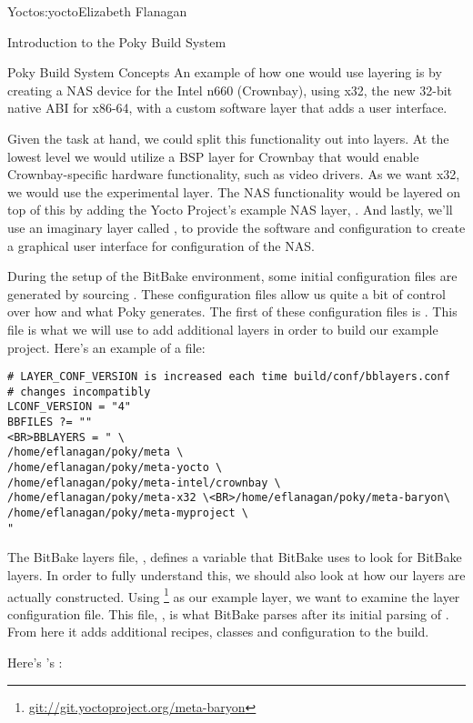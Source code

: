 \begin{aosachapter}{Yocto}{s:yocto}{Elizabeth Flanagan}
\begin{aosasect1}{Introduction to the Poky Build System}
\begin{aosasect2}{Poky Build System Concepts}
An example of how one would use layering is by creating a NAS device
for the Intel n660 (Crownbay), using x32, the new 32-bit native
ABI for x86-64, with a custom software layer that adds a user
interface.

Given the task at hand, we could split this functionality out into
layers. At the lowest level we would utilize a BSP layer for Crownbay
that would enable Crownbay-specific hardware functionality, such as
video drivers. As we want x32, we would use the experimental 
layer. The NAS functionality would be layered on top of this by adding
the Yocto Project's example NAS layer, . And lastly, we'll
use an imaginary layer called , to provide the software
and configuration to create a graphical user interface for
configuration of the NAS.


During the setup of the BitBake environment, some initial configuration files are generated by sourcing .
These configuration files allow us quite a bit of control over how and
what Poky generates. The first of these configuration files is
. This file is what we will use to add additional layers
in order to build our example project. Here's an example of 
a  file:

\begin{verbatim}
# LAYER_CONF_VERSION is increased each time build/conf/bblayers.conf
# changes incompatibly
LCONF_VERSION = "4"
BBFILES ?= ""
<BR>BBLAYERS = " \
/home/eflanagan/poky/meta \
/home/eflanagan/poky/meta-yocto \
/home/eflanagan/poky/meta-intel/crownbay \
/home/eflanagan/poky/meta-x32 \<BR>/home/eflanagan/poky/meta-baryon\
/home/eflanagan/poky/meta-myproject \
"
\end{verbatim}

The BitBake layers file, \code{bblayers}, defines a variable  that
BitBake uses to look for BitBake layers. In order to fully understand
this, we should also look at how our layers are actually
constructed. Using
 \footnote{\url{git://git.yoctoproject.org/meta-baryon}} as
our example layer, we want to examine the layer configuration
file. This file, \code{conf/layer.conf}, is what BitBake parses after its
initial parsing of \code{bblayers.conf}. From here it adds additional
recipes, classes and configuration to the build.

Here's \code{meta-baryon}'s \code{layer.conf}:


\end{aosasect2}
\end{aosasect1}
\end{aosachapter}
